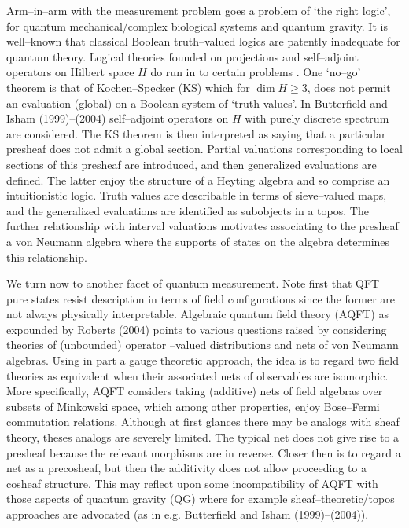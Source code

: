 \documentclass[12pt]{article}
\begin{document}
Arm--in--arm with the measurement problem goes a problem of 
`the right logic', for quantum mechanical/complex biological systems
and quantum gravity. It is well--known that classical Boolean
truth--valued logics are patently inadequate for quantum theory.
Logical theories founded on projections and self--adjoint
operators on Hilbert space $H$ do run in to certain problems . One
`no--go' theorem is that of Kochen--Specker (KS) which for $\dim H
\geq 3$, does not permit an evaluation (global) on a Boolean
system of `truth values'. In Butterfield and Isham (1999)--(2004)
self--adjoint operators on $H$ with purely discrete spectrum are
considered. The KS theorem is then interpreted as saying that a
particular presheaf does not admit a global section. Partial
valuations corresponding to local sections of this presheaf are
introduced, and then generalized evaluations are defined. The
latter enjoy the structure of a Heyting algebra and so comprise an
intuitionistic logic. Truth values are describable in terms of
sieve--valued maps, and the generalized evaluations are identified
as subobjects in a topos. The further relationship with interval
valuations motivates associating to the presheaf a von Neumann
algebra where the supports of states on the algebra determines
this relationship.

We turn now to another facet of quantum measurement. Note first
that QFT pure states resist description in terms of field
configurations since the former are not always physically
interpretable. Algebraic quantum field theory (AQFT) as expounded
by Roberts (2004) points to various questions raised by
considering theories of (unbounded) operator --valued
distributions and nets of von Neumann algebras. Using in part a
gauge theoretic approach, the idea is to regard two field theories
as equivalent when their associated nets of observables are
isomorphic. More specifically, AQFT considers taking (additive)
nets of field algebras over subsets of Minkowski space, which among 
other properties, enjoy Bose--Fermi commutation relations. Although 
at first glances there may be analogs with sheaf theory, theses 
analogs are severely limited. The typical net does not give rise to 
a presheaf because the relevant morphisms are in reverse. Closer 
then is to regard a net as a precosheaf, but then the additivity 
does not allow proceeding to a cosheaf structure. This may reflect 
upon some incompatibility of AQFT with those aspects of quantum 
gravity (QG) where for example sheaf--theoretic/topos approaches 
are advocated (as in e.g. Butterfield and Isham (1999)--(2004)).




\end{document}
